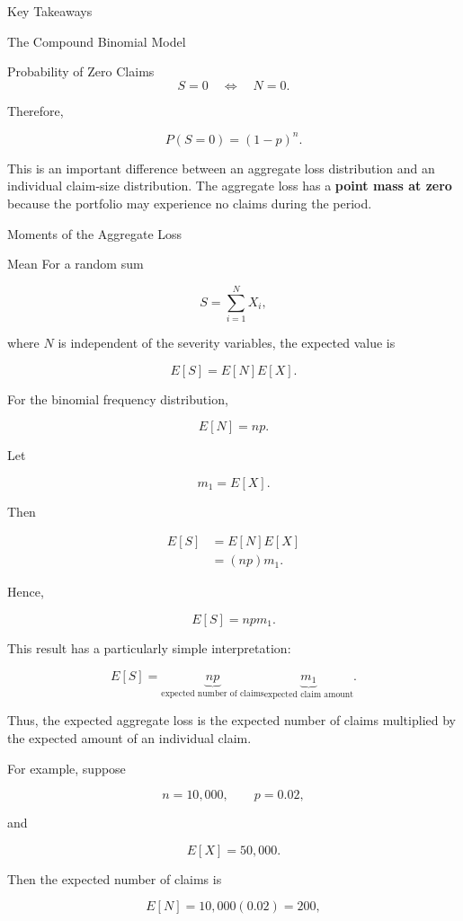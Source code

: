 \documentclass[
  ignorenonframetext,
  aspectratio=169,
]{beamer}
\begin{document}
\begin{frame}{Key Takeaways}
\begin{block}{The Compound Binomial Model}
\begin{block}{Probability of Zero Claims}
\[
S=0
\quad\Longleftrightarrow\quad
N=0.
\]

Therefore,

\[
\boxed{
P(S=0)=(1-p)^n.
}
\]

This is an important difference between an aggregate loss distribution
and an individual claim-size distribution. The aggregate loss has a
\textbf{point mass at zero} because the portfolio may experience no
claims during the period.
\end{block}

\begin{block}{Moments of the Aggregate Loss}
\protect{}\label{moments-of-the-aggregate-loss}
\end{block}

\begin{block}{Mean}
\protect{}\label{mean}
For a random sum

\[
S=\sum_{i=1}^{N}X_i,
\]

where \(N\) is independent of the severity variables, the expected value
is

\[
E[S]=E[N]E[X].
\]

For the binomial frequency distribution,

\[
E[N]=np.
\]

Let

\[
m_1=E[X].
\]

Then

\[
\begin{aligned}
E[S]
&=E[N]E[X]\\
&=(np)m_1.
\end{aligned}
\]

Hence,

\[
\boxed{
E[S]=npm_1.
}
\]

This result has a particularly simple interpretation:

\[
\boxed{
E[S]
=
\underbrace{np}_{\text{expected number of claims}}
\underbrace{m_1}_{\text{expected claim amount}}.
}
\]

Thus, the expected aggregate loss is the expected number of claims
multiplied by the expected amount of an individual claim.

For example, suppose

\[
n=10{,}000,
\qquad
p=0.02,
\]

and

\[
E[X]=50{,}000.
\]

Then the expected number of claims is

\[
E[N]=10{,}000(0.02)=200,
\]


\end{block}
\end{block}
\end{frame}
\end{document}
